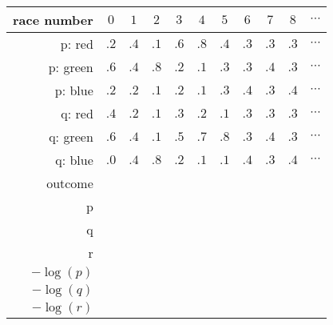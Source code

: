 \documentclass[14pt]{extarticle} %
\begin{document}
 \begin{tabular}{r|c|c|c|c|c|c|c|c|c|c}
      race number  & $0$ & $1$ & $2$ & $3$ & $4$ & $5$ & $6$ & $7$  & $8$ &$\cdots$
      \\ \hline 
      p: red & $.2$ & $.4$ & $.1$ & $.6$ & $.8$ & $.4$ & $.3$ & $.3$  & $.3$
      &$\cdots$ \\ 
      p: green & $.6$ & $.4$ & $.8$ & $.2$ & $.1$ & $.3$ & $.3$ & $.4$  & $.3$
      &$\cdots$ \\ 
      p: blue & $.2$ & $.2$ & $.1$ & $.2$ & $.1$ & $.3$ & $.4$ & $.3$  & $.4$
      &$\cdots$ \\ \hline
      q: red & $.4$ & $.2$ & $.1$ & $.3$ & $.2$ & $.1$ & $.3$ & $.3$  & $.3$
      &$\cdots$ \\ 
      q: green & $.6$ & $.4$ & $.1$ & $.5$ & $.7$ & $.8$ & $.3$ & $.4$  & $.3$
      &$\cdots$ \\ 
      q: blue & $.0$ & $.4$ & $.8$ & $.2$ & $.1$ & $.1$ & $.4$ & $.3$  & $.4$
      &$\cdots$ \\ \hline \hline
      outcome & & & & & & & & & & \\ \hline\hline
      p & & & & & & & & & & \\ \hline
      q & & & & & & & & & & \\ \hline
      r & & & & & & & & & & \\ \hline\hline
      $-\log(p)$ & & & & & & & & & & \\ \hline
      $-\log(q)$ & & & & & & & & & & \\ \hline
      $-\log(r)$ & & & & & & & & & & \\ \hline

    \end{tabular}
\end{document}
